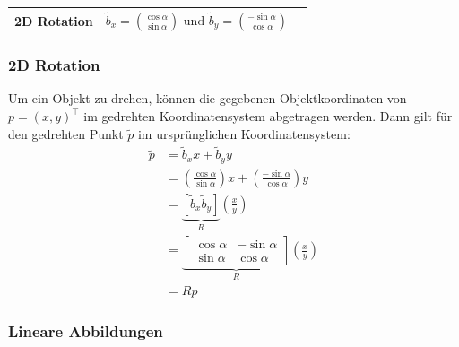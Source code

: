 \documentclass{scrartcl}
\begin{document}
\begin{tabular}{|c|c|c|}
	\hline 2D Rotation & \parbox[c][4cm]{6cm}{$\widetilde{b}_x = (\frac{\cos \alpha}{\sin \alpha}) \text{ und } \widetilde{b}_y = (\frac{-\sin \alpha}{\cos \alpha})$} &  \\
	\hline
\end{tabular} 

\subsubsection{2D Rotation}

Um ein Objekt zu drehen, können die gegebenen Objektkoordinaten von $p = (x,y)^\top$ im gedrehten Koordinatensystem abgetragen werden. Dann gilt für den gedrehten Punkt $\widetilde{p}$ im ursprünglichen Koordinatensystem: \\

\begin{equation}
	\begin{split}
	\widetilde{p} &= \widetilde{b}_x x + \widetilde{b}_y y \\
	&= (\frac{\cos \alpha}{\sin \alpha})x + (\frac{-\sin \alpha}{\cos \alpha})y \\
	&= \underbrace{[\widetilde{b}_x \widetilde{b}_y]}_R (\frac{x}{y}) \\
	&= \underbrace{\begin{bmatrix}
	\cos \alpha & -\sin \alpha \\ \sin \alpha & \cos \alpha
	\end{bmatrix}}_R (\frac{x}{y}) \\
	&= Rp
	\end{split}
\end{equation}

\subsubsection{Lineare Abbildungen}
\end{document}
